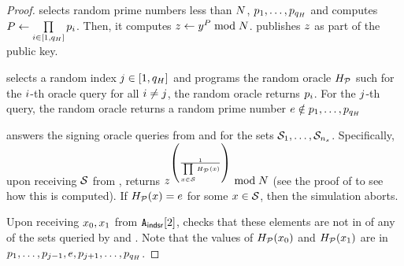 \begin{proof}
\enumListStart
%	
		\item \rsaAdversary selects \oracleQueries random prime numbers less than $N$, 
	$\randPrimes[1], \dots, 
	\randPrimes[\oracleQueries]$ and computes $\randPrimeAccSet \gets \prod\limits_{\setIdx \in 
		[1, \oracleQueries]} \randPrimes[\setIdx]$. Then, it computes 	$\simFnOutput \gets 
	\genericFnOutput^{\randPrimeAccSet} \bmod \rsaMod$. \rsaAdversary publishes 
	$z$ as part of the public key. 
	
	\item\rsaAdversary selects a random index $j \in [1, q_H]$ and programs the 
	random oracle $H_{\mathcal{P}}$ such for the $i$-th oracle query for all $i \neq j$, the random 
	oracle returns $\randPrimes[\setIdx]$. For the $j$-th query, the random oracle returns a 
	random prime number $\rsaExponent \notin \randPrimes[1], \dots, 
	\randPrimes[\oracleQueries]$
	
	
	\item \rsaAdversary answers the signing oracle queries from  and 
	 for the sets $\genericSetVar[1], \dots, 
	\genericSetVar[\numberOfSetsQueried]$. Specifically, upon receiving 
	$\genericSetVar$ from , \rsaAdversary returns 
	$\simFnOutput^{\left(\frac{1}{\challengeSetAcc}\right)} \bmod \rsaMod$ (see the proof of  to see how this is computed). If 
	$\primeRO(\genericSetElmt) = \rsaExponent$ for some $\genericSetElmt \in \genericSetVar$, then 
	the simulation aborts. 

	\item Upon receiving $\genericSetElmt[0], \genericSetElmt[1]$ from $\indsrAdversary{2}$, 
	\rsaAdversary checks that these elements are not in of any of the sets queried by  
	 and . Note that the values of 
	$\primeRO(\genericSetElmt[0])$ and $\primeRO(\genericSetElmt[1])$ are 
	in $\randPrimes[1],\dots, \randPrimes[\randIdx-1], \rsaExponent, 
	\randPrimes[\randIdx +1], \dots, \randPrimes[\oracleQueries]$. 
	

\end{proof}
